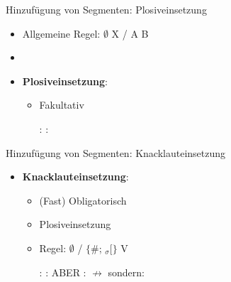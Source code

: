 
\begin{frame}{Hinzufügung von Segmenten: Plosiveinsetzung}

\begin{itemize}
	\item Allgemeine Regel: $\emptyset$ \ras X / A \underline{\quad} B
	\item[]
	\item \textbf{Plosiveinsetzung}:
	
	\begin{itemize}
		\item Fakultativ
		
	\eal
		\ex {}:  \ras \textipa{[Pampt]}
		\ex {}:  \ras \textipa{[gants]}
	\zl
	
	\end{itemize}

\end{itemize}
\end{frame}


\begin{frame}{Hinzufügung von Segmenten: Knacklauteinsetzung}

\begin{itemize}
	\item \textbf{Knacklauteinsetzung}:

	\begin{itemize}
		\item (Fast) Obligatorisch
		\item Plosiveinsetzung
		\item Regel: $\emptyset$ \ras \textipa{[P]} / 
		$\{$\#; \textprimstress$_\sigma[\}$ 
\underline{\quad} V

	\eal
		\ex {}:  \ras {}
		\ex {}:  \ras \textipa{[Pa\t{pf}@l]}
		\ex ABER :  $\nrightarrow$ \textipa{[\textprimstress ge:.P@n]} sondern: \textipa{[\textprimstress ge:.@n]}
	\zl
	
	\end{itemize}
			
\end{itemize}

\end{frame}


